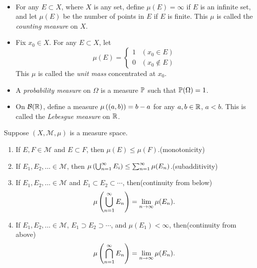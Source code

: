 \begin{example} \
\begin{itemize}
\item For any $E\subset X$, where $X$ is any set, define $\mu(E)=\infty$ if $E$ is an infinite set, and let $\mu(E)$ be the number of points in $E$ if $E$ is finite. This $\mu$ is called the \emph{counting measure} on $X$. 
\item Fix $x_0\in X$. For any $E\subset X$, let
\[\mu(E)=\begin{cases}
1&(x_0\in E)\\
0&(x_0\notin E)
\end{cases}\]
This $\mu$ is called the \emph{unit mass} concentrated at $x_0$.

\item A \emph{probability measure} on $\Omega$ is a measure $\mathbb P$ such that $\mathbb P(\Omega)=1$.

\item On $\mathcal{B}(\mathbb R)$, define a measure $\mu\left((a,b)\right)=b-a$ for any $a,b\in\mathbb R$, $a<b$. This is called the \emph{Lebesgue measure} on $\mathbb R$.
\end{itemize}
\end{example}

\begin{lemma}
Suppose $(X,\mathcal{M},\mu)$ is a measure space.
\begin{enumerate}[label=(\roman*)]
\item If $E,F\in\mathcal{M}$ and $E\subset F$, then $\mu(E)\le\mu(F)$.\hfill(monotonicity)
\item If $E_1,E_2,\dots\in\mathcal{M}$, then $\mu\left(\bigcup_{n=1}^{\infty}E_i\right)\le\sum_{n=1}^{\infty}\mu(E_n)$.\hfill(subadditivity)
\item If $E_1,E_2,\dots\in\mathcal{M}$ and $E_1\subset E_2\subset\cdots$, then\hfill(continuity from below)
\[\mu\left(\bigcup_{n=1}^{\infty}E_n\right)=\lim_{n\to\infty}\mu(E_n).\]
\item If $E_1,E_2,\dots\in\mathcal{M}$, $E_1\supset E_2\supset\cdots$, and $\mu(E_1)<\infty$, then\hfill(continuity from above)
\[\mu\left(\bigcap_{n=1}^{\infty}E_n\right)=\lim_{n\to\infty}\mu(E_n).\]
\end{enumerate}
\end{lemma}

